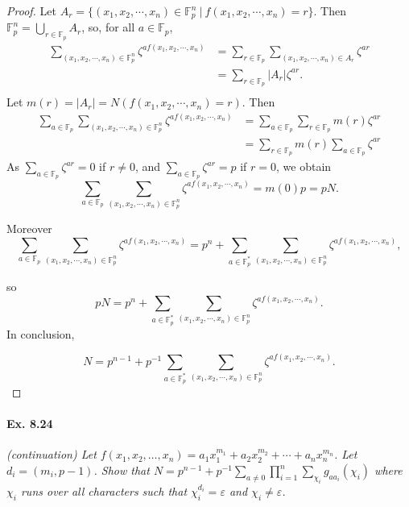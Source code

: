 \documentclass[11pt,a4paper]{article}
\begin{document}
{\begin{proof}
Let $A_r= \{(x_1,x_2,\cdots,x_n)\in\mathbb{F}_p^n \ \vert \ f(x_1,x_2,\cdots,x_n)=r\}$. Then $\mathbb{F}_p^n = \bigcup_{r\in\mathbb{F}_p} A_r$, so, for all $a \in \mathbb{F}_p$,
\begin{align*}
\sum\limits_{(x_1,x_2,\cdots,x_n) \in \mathbb{F}_p^n} \zeta^{af(x_1,x_2,\cdots,x_n)} 
&=\sum\limits_{r\in \mathbb{F}_p} \sum\limits_{(x_1,x_2,\cdots,x_n) \in A_r}  \zeta^{ar}\\
&=\sum\limits_{r\in \mathbb{F}_p} \vert A_r\vert \zeta^{ar}.\\
\end{align*}
Let $m(r) = \vert A_r\vert = N(f(x_1,x_2,\cdots,x_n)=r)$. Then
\begin{align*}
\sum\limits_{a\in \mathbb{F}_p} \sum\limits_{(x_1,x_2,\cdots,x_n) \in \mathbb{F}_p^n} \zeta^{af(x_1,x_2,\cdots,x_n)} &=\sum\limits_{a\in \mathbb{F}_p}\sum\limits_{r\in \mathbb{F}_p} m(r) \zeta^{ar}\\
&=\sum\limits_{r\in \mathbb{F}_p} m(r) \sum\limits_{a\in \mathbb{F}_p} \zeta^{ar}
\end{align*}
As $\sum\limits_{a\in \mathbb{F}_p} \zeta^{ar}=0$ if $r\neq 0$, and $\sum\limits_{a\in \mathbb{F}_p} \zeta^{ar} = p$ if $r=0$, we obtain
$$\sum\limits_{a\in \mathbb{F}_p} \sum\limits_{(x_1,x_2,\cdots,x_n) \in \mathbb{F}_p^n} \zeta^{af(x_1,x_2,\cdots,x_n)} = m(0) p = p N.$$

Moreover
$$\sum\limits_{a\in \mathbb{F}_p} \sum\limits_{(x_1,x_2,\cdots,x_n) \in \mathbb{F}_p^n} \zeta^{af(x_1,x_2,\cdots,x_n)} = p^n + \sum\limits_{a\in \mathbb{F}_p^*} \sum\limits_{(x_1,x_2,\cdots,x_n) \in \mathbb{F}_p^n} \zeta^{af(x_1,x_2,\cdots,x_n)},$$

so $$pN = p^n +\sum\limits_{a\in \mathbb{F}_p^*} \sum\limits_{(x_1,x_2,\cdots,x_n) \in \mathbb{F}_p^n} \zeta^{af(x_1,x_2,\cdots,x_n)}.$$  In conclusion,

$$N = p^{n-1}+p^{-1} \sum\limits_{a\in \mathbb{F}_p^*} \sum\limits_{(x_1,x_2,\cdots,x_n) \in \mathbb{F}_p^n} \zeta^{af(x_1,x_2,\cdots,x_n)}.$$
\end{proof}

\paragraph{Ex. 8.24}

{\it (continuation) Let $f(x_1,x_2,\ldots,x_n) = a_1x_1^{m_1}+a_2x_2^{m_2}+\cdots+a_n x_n^{m_n}$. Let $d_i = (m_i,p-1)$. Show that $N = p^{n-1} + p^{-1} \sum_{a\neq 0} \prod_{i=1}^n \sum_{\chi_i} g_{aa_i}(\chi_i)$ where $\chi_i$ runs over all characters such that $\chi_i^{d_i} = \varepsilon$ and $\chi_i \neq \varepsilon$.
}

}
\end{document}
